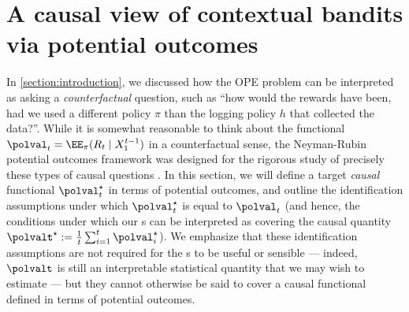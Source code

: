 \section{A causal view of contextual bandits via potential outcomes}\label{section:causal}

In \cref{section:introduction}, we discussed how the OPE problem can be interpreted as asking a \emph{counterfactual} question, such as ``how would the rewards have been, had we used a different policy $\pi$ than the logging policy $h$ that collected the data?''. While it is somewhat reasonable to think about the functional $\polval_t = \EE_\pi(R_t \mid X_1^{t-1})$ in a counterfactual sense, the Neyman-Rubin potential outcomes framework was designed for the rigorous study of precisely these types of causal questions \citep{splawa1990application,rubin1974estimating}. In this section, we will define a target \emph{causal} functional $\polval_t^\star$ in terms of potential outcomes, and outline the identification assumptions under which $\polval_t^\star$ is equal to $\polval_t$ (and hence, the conditions under which our \cs{}s can be interpreted as covering the causal quantity $\polvalt^\star := \frac{1}{t}\sum_{i=1}^t \polval_i^\star$). We emphasize that these identification assumptions are not required for the \cs{}s to be useful or sensible --- indeed, $\polvalt$ is still an interpretable statistical quantity that we may wish to estimate --- but they cannot otherwise be said to cover a causal functional defined in terms of potential outcomes.

